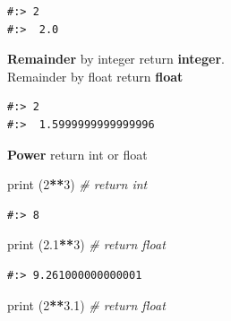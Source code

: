 \documentclass[
]{book}
\newenvironment{Shaded}{\begin{snugshade}}{\end{snugshade}}
\newcommand{\BuiltInTok}[1]{#1}
\newcommand{\CharTok}[1]{\textcolor[rgb]{0.5,0.5,0.5}{#1}}
\newcommand{\CommentTok}[1]{\textcolor[rgb]{0.37,0.37,0.37}{\textit{#1}}}
\newcommand{\DecValTok}[1]{\textcolor[rgb]{0.06,0.06,0.06}{#1}}
\newcommand{\FloatTok}[1]{\textcolor[rgb]{0.06,0.06,0.06}{#1}}
\newcommand{\NormalTok}[1]{#1}
\newcommand{\OperatorTok}[1]{\textcolor[rgb]{0.43,0.43,0.43}{\textbf{#1}}}
\newcommand{\StringTok}[1]{\textcolor[rgb]{0.5,0.5,0.5}{#1}}
\begin{document}
\begin{verbatim}
#:> 2 
#:>  2.0
\end{verbatim}

\textbf{Remainder} by integer return \textbf{integer}.\\
Remainder by float return \textbf{float}

\begin{Shaded}
\end{Shaded}

\begin{verbatim}
#:> 2 
#:>  1.5999999999999996
\end{verbatim}

\textbf{Power} return int or float

\begin{Shaded}
\begin{Highlighting}[]
\BuiltInTok{print}\NormalTok{ (}\DecValTok{2}\OperatorTok{**}\DecValTok{3}\NormalTok{)    }\CommentTok{# return int}
\end{Highlighting}
\end{Shaded}

\begin{verbatim}
#:> 8
\end{verbatim}

\begin{Shaded}
\begin{Highlighting}[]
\BuiltInTok{print}\NormalTok{ (}\FloatTok{2.1}\OperatorTok{**}\DecValTok{3}\NormalTok{)  }\CommentTok{# return float}
\end{Highlighting}
\end{Shaded}

\begin{verbatim}
#:> 9.261000000000001
\end{verbatim}

\begin{Shaded}
\begin{Highlighting}[]
\BuiltInTok{print}\NormalTok{ (}\DecValTok{2}\OperatorTok{**}\FloatTok{3.1}\NormalTok{)  }\CommentTok{# return float}
\end{Highlighting}
\end{Shaded}
\end{document}
